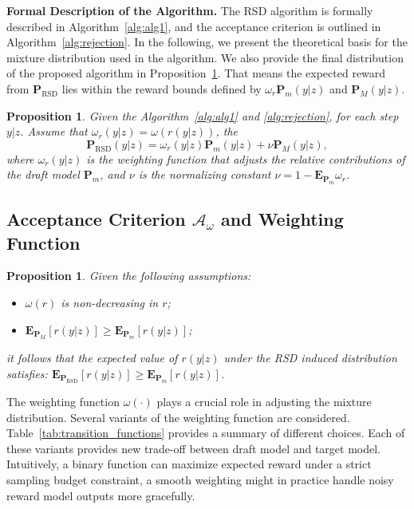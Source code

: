 \documentclass{article}
\theoremstyle{plain}
\newtheorem{proposition}[theorem]{Proposition}
\theoremstyle{definition}
\theoremstyle{remark}
\begin{document}
\textbf{Formal Description of the Algorithm.}
The RSD algorithm is formally described in Algorithm~\ref{alg:alg1}, and the acceptance criterion is outlined in Algorithm~\ref{alg:rejection}. In the following, we present the theoretical basis for the mixture distribution used in the algorithm.
We also provide the final distribution of the proposed algorithm in  Proposition~\ref{prop:mixture}. That means the expected reward from $\mathbf{P}_{\mathrm{RSD}}$ lies within the reward bounds defined by $\omega_r\mathbf{P}_m(y|z)$ and $\mathbf{P}_M(y|z)$.
\begin{proposition}\label{prop:mixture}
    Given the Algorithm~\ref{alg:alg1} and \ref{alg:rejection}, for each step $y|z$. Assume that $\omega_r(y|z) = \omega(r(y|z)) $, the 
\begin{equation}
 \mathbf{P}_{\mathrm{RSD}}(y|z) =  \omega_r(y|z) \mathbf{P}_m(y|z) + \nu
\mathbf{P}_M(y|z),   
\end{equation}
    where \( \omega_r(y|z) \) is the weighting function that adjusts the relative contributions of the draft model \( \mathbf{P}_m \), and $\nu$ is the normalizing constant $\nu = 1-\mathbf{E}_{\mathbf{P}_m}\omega_r$.
\end{proposition}



\subsection{Acceptance Criterion $\mathcal{A}_\omega$ and Weighting Function}

\begin{proposition}\label{prop:reward}
    Given the following assumptions:
    \begin{itemize}[itemsep=0pt]
        \item $\omega(r)$  is non-decreasing in $r$;
        \item $\mathbf{E}_{\mathbf{P}_M}[r(y|z)]\geq \mathbf{E}_{\mathbf{P}_m}[r(y|z)]$;
    \end{itemize}
    it follows that the expected value of  
     $r(y|z)$ under the RSD induced distribution satisfies:
     $\mathbf{E}_{\mathbf{P}_{\text{RSD}}}[r(y|z)] \geq \mathbf{E}_{\mathbf{P}_m}[r(y|z)]$.
\end{proposition}

The weighting function 
$\omega(\cdot)$ plays a crucial role in adjusting the mixture distribution. Several variants of the weighting function are considered. Table~\ref{tab:transition_functions} provides a summary of different choices. Each of these variants provides new trade-off between draft model and target model. Intuitively, a binary function can maximize expected reward under a strict sampling budget constraint, a smooth weighting might in practice handle noisy reward model outputs more gracefully.
\end{document}
